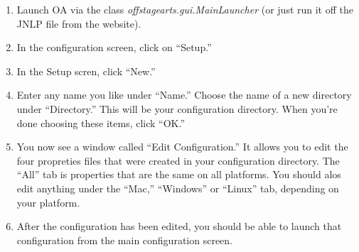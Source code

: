 \documentclass[11pt]{article}
\begin{document}
\begin{enumerate}

 \item Launch OA via the class \emph{offstagearts.gui.MainLauncher} (or just run it off the JNLP file from the website).

 \item In the configuration screen, click on ``Setup.''

 \item In the Setup scren, click ``New.''

 \item Enter any name you like under ``Name.'' Choose the name of a new directory under ``Directory.''  This will be your configuration directory.  When you're done choosing these items, click ``OK.''

 \item You now see a window called ``Edit Configuration.'' It allows you to edit the four propreties files that were created in your configuration directory.  The ``All'' tab is properties that are the same on all platforms.  You should alos edit anything under the ``Mac,'' ``Windows'' or ``Linux'' tab, depending on your platform.

 \item After the configuration has been edited, you should be able to launch that configuration from the main configuration screen.

\end{enumerate}
\end{document}
